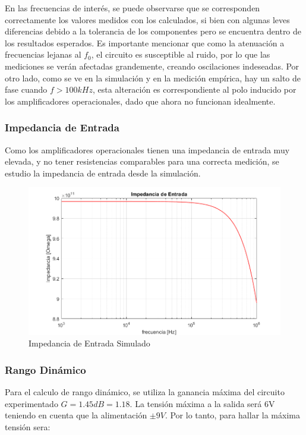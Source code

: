 En las frecuencias de interés, se puede observarse que se corresponden correctamente los valores medidos con los calculados, si bien con algunas leves diferencias debido a la tolerancia de los componentes pero se encuentra dentro de los resultados esperados. Es importante mencionar que como la atenuación a frecuencias lejanas al $f_0$, el circuito es susceptible al ruido, por lo que las mediciones se verán afectadas grandemente, creando oscilaciones indeseadas. Por otro lado, como se ve en la simulación y en la medición empírica, hay un salto de fase cuando $f>100kHz$, esta alteración es correspondiente al polo inducido por los amplificadores operacionales, dado que ahora no funcionan idealmente. 


\subsubsection{Impedancia de Entrada}

Como los amplificadores operacionales tienen una impedancia de entrada muy elevada, y no tener resistencias comparables para una correcta medición, se estudio la impedancia de entrada desde la simulación.

\begin{figure}[H]
    \centering
    \includegraphics[scale = 0.5]{zin.png}
    \caption{Impedancia de Entrada Simulado}
    \label{ej22zin}
\end{figure}

\subsubsection{Rango Dinámico}

Para el calculo de rango dinámico, se utiliza la ganancia máxima del circuito experimentado $G = 1.45dB = 1.18$. La tensi\'on m\'axima a la salida ser\'a 6V teniendo en cuenta que la alimentaci\'on $\pm 9V$. Por lo tanto, para hallar la m\'axima tensión sera:


